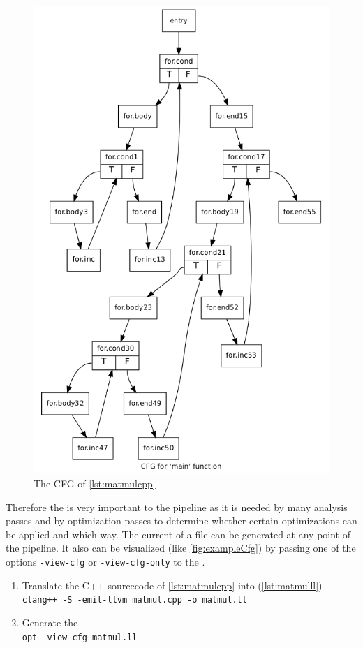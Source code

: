 \begin{figure}[!h]
    \caption{The CFG of \autoref{lst:matmulcpp}}
    \label{fig:exampleCfg}
    \includegraphics[width=\textwidth]{gfx/matmulCfg.png}
\end{figure}
Therefore the \cfg is very important to the pipeline as it is needed by many analysis passes and by optimization passes to determine whether certain optimizations can be applied and which way.
The current \cfg of a \llvmir file can be generated at any point of the pipeline.
It also can be visualized (like \autoref{fig:exampleCfg}) by passing one of the options \texttt{-view-cfg} or \texttt{-view-cfg-only} to the \opt.
\begin{enumerate}
    \item Translate the C++ sourcecode of \autoref{lst:matmulcpp} into \llvmir (\autoref{lst:matmulll})\\
        \texttt{clang++ -S -emit-llvm matmul.cpp -o matmul.ll}
    \item Generate the \cfg\\
        \texttt{opt -view-cfg matmul.ll}
\end{enumerate}
